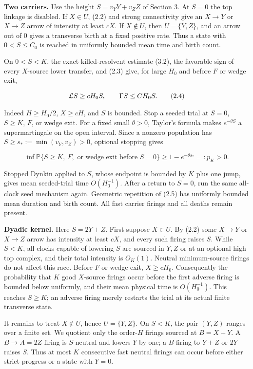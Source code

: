\textbf{Two carriers.} Use the height \(S=v_YY+v_ZZ\) of Section 3. At
\(S=0\) the top linkage is disabled. If \(X\in U\), (2.2) and strong
connectivity give an \(X\to Y\) or \(X\to Z\) arrow of intensity at
least \(cX\). If \(X\notin U\), then \(U=\{Y,Z\}\), and an arrow out of
\(0\) gives a transverse birth at a fixed positive rate. Thus a state
with \(0<S\le C_0\) is reached in uniformly bounded mean time and birth
count.

On \(0<S<K\), the exact killed-resolvent estimate (3.2), the favorable
sign of every \(X\)-source lower transfer, and (2.3) give, for large
\(H_0\) and before \(F\) or wedge exit,

\[
 {\cal L}S\ge cH_0S,\qquad
 \Gamma S\le CH_0S.                                  \tag{2.4}
\]

Indeed \(H\ge H_0/2\), \(X\ge cH\), and \(S\) is bounded. Stop a seeded
trial at \(S=0\), \(S\ge K\), \(F\), or wedge exit. For a fixed small
\(\theta>0\), Taylor's formula makes \(e^{-\theta S}\) a supermartingale
on the open interval. Since a nonzero population has
\(S\ge s_*:=\min(v_Y,v_Z)>0\), optional stopping gives

\[
 \inf\mathbb P\{S\ge K,\ F,\text{ or wedge exit before }S=0\}
       \ge 1-e^{-\theta s_*}=:p_K>0.                 \tag{2.5}
\]

Stopped Dynkin applied to \(S\), whose endpoint is bounded by \(K\) plus
one jump, gives mean seeded-trial time \(O(H_0^{-1})\). After a return
to \(S=0\), run the same all-clock seed mechanism again. Geometric
repetition of (2.5) has uniformly bounded mean duration and birth count.
All fast carrier firings and all deaths remain present.

\textbf{Dyadic kernel.} Here \(S=2Y+Z\). First suppose \(X\in U\). By
(2.2) some \(X\to Y\) or \(X\to Z\) arrow has intensity at least \(cX\),
and every such firing raises \(S\). While \(S<K\), all clocks capable of
lowering \(S\) are sourced in \(Y,Z\) or at an optional high top
complex, and their total intensity is \(O_K(1)\). Neutral minimum-source
firings do not affect this race. Before \(F\) or wedge exit,
\(X\ge cH_0\). Consequently the probability that \(K\) good \(X\)-source
firings occur before the first adverse firing is bounded below
uniformly, and their mean physical time is \(O(H_0^{-1})\). This reaches
\(S\ge K\); an adverse firing merely restarts the trial at its actual
finite transverse state.

It remains to treat \(X\notin U\), hence \(U=\{Y,Z\}\). On \(S<K\), the
pair \((Y,Z)\) ranges over a finite set. We quotient only the
order-\(H\) firings sourced at \(B=X+Y\). A \(B\to A=2Z\) firing is
\(S\)-neutral and lowers \(Y\) by one; a \(B\)-firing to \(Y+Z\) or
\(2Y\) raises \(S\). Thus at most \(K\) consecutive fast neutral firings
can occur before either strict progress or a state with \(Y=0\).


